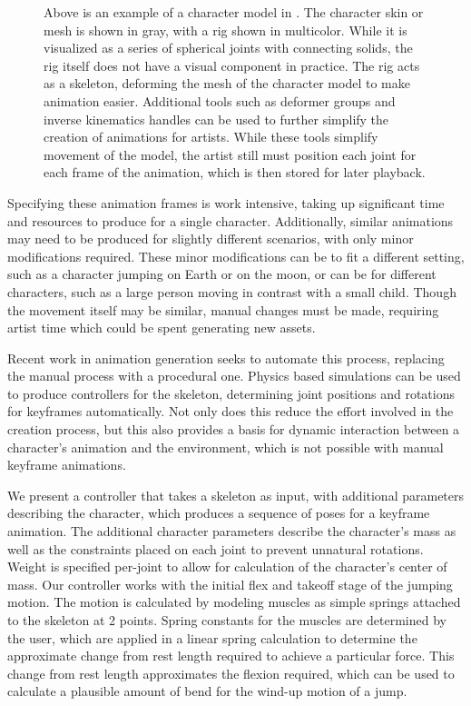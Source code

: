 \begin{figure}[htp]
\begin{subfigure}[b]{0.3\textwidth}
	\end{subfigure}
	\caption[Example of Rigged 3D Character Model]{Above is an example of a character model in \maya.  The character skin or mesh is shown in gray, with a rig shown in multicolor.  While it is visualized as a series of spherical joints with connecting solids, the rig itself does not have a visual component in practice.  The rig acts as a skeleton, deforming the mesh of the character model to make animation easier.  Additional tools such as deformer groups and inverse kinematics handles can be used to further simplify the creation of animations for artists.  While these tools simplify movement of the model, the artist still must position each joint for each frame of the animation, which is then stored for later playback.}
	\label{fig:rig_character}
\end{figure}

Specifying these animation frames is work intensive, taking up significant time and resources to produce for a single character.  Additionally, similar animations may need to be produced for slightly different scenarios, with only minor modifications required.  These minor modifications can be to fit a different setting, such as a character jumping on Earth or on the moon, or can be for different characters, such as a large person moving in contrast with a small child.  Though the movement itself may be similar, manual changes must be made, requiring artist time which could be spent generating new assets.  

Recent work in animation generation seeks to automate this process, replacing the manual process with a procedural one.  Physics based simulations can be used to produce controllers for the skeleton, determining joint positions and rotations for keyframes automatically.  Not only does this reduce the effort involved in the creation process, but this also provides a basis for dynamic interaction between a character's animation and the environment, which is not possible with manual keyframe animations.

We present a controller that takes a skeleton as input, with additional parameters describing the character, which produces a sequence of poses for a keyframe animation.  The additional character parameters describe the character's mass as well as the constraints placed on each joint to prevent unnatural rotations.  Weight is specified per-joint to allow for calculation of the character's center of mass.  Our controller works with the initial flex and takeoff stage of the jumping motion.  The motion is calculated by modeling muscles as simple springs attached to the skeleton at 2 points.  Spring constants for the muscles are determined by the user, which are applied in a linear spring calculation to determine the approximate change from rest length required to achieve a particular force.  This change from rest length approximates the flexion required, which can be used to calculate a plausible amount of bend for the wind-up motion of a jump.

